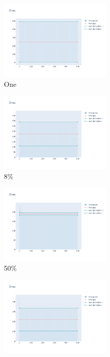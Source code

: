 \documentclass[12pt, fleqn]{report}                             %
\theoremstyle{break}                                            %
\begin{document}
      \begin{figure}[ht!]
        \centering
        \begin{subfigure}[b]{0.4\linewidth}
          \includegraphics[width=0.6\textwidth]{Images/37/dia-a.png}
          \caption{One}
        \end{subfigure}
        \begin{subfigure}[b]{0.4\linewidth}
          \includegraphics[width=0.6\textwidth]{Images/37/dia-b.png}
          \caption{8\%}
        \end{subfigure}
        \begin{subfigure}[b]{0.4\linewidth}
          \includegraphics[width=0.6\textwidth]{Images/37/dia-c.png}
          \caption{50\%}
        \end{subfigure}
        \begin{subfigure}[b]{0.4\linewidth}
          \includegraphics[width=0.6\textwidth]{Images/37/dia-d.png}

\end{subfigure}
\end{figure}
\end{document}
